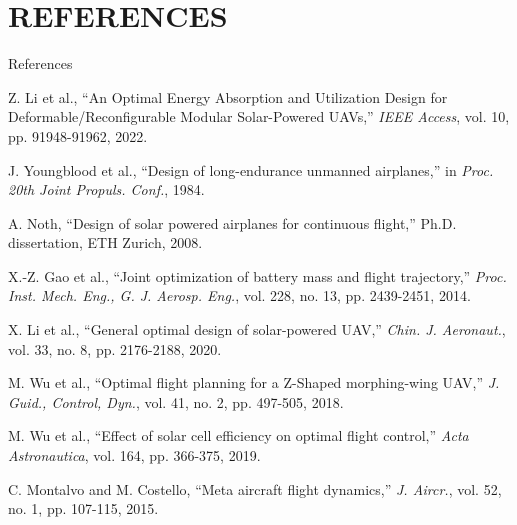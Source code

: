 \documentclass{beamer}
\begin{document}
\section{REFERENCES}

\begin{frame}{References}
    \scriptsize
    \setlength{\itemsep}{1pt}
    \setlength{\parskip}{1pt}
    \begin{thebibliography}{99}
        
         Z. Li et al., ``An Optimal Energy Absorption and Utilization Design for Deformable/Reconfigurable Modular Solar-Powered UAVs,'' \emph{IEEE Access}, vol. 10, pp. 91948-91962, 2022.
        
         J. Youngblood et al., ``Design of long-endurance unmanned airplanes,'' in \emph{Proc. 20th Joint Propuls. Conf.}, 1984.
        
         A. Noth, ``Design of solar powered airplanes for continuous flight,'' Ph.D. dissertation, ETH Zurich, 2008.
        
         X.-Z. Gao et al., ``Joint optimization of battery mass and flight trajectory,'' \emph{Proc. Inst. Mech. Eng., G. J. Aerosp. Eng.}, vol. 228, no. 13, pp. 2439-2451, 2014.
        
         X. Li et al., ``General optimal design of solar-powered UAV,'' \emph{Chin. J. Aeronaut.}, vol. 33, no. 8, pp. 2176-2188, 2020.
        
         M. Wu et al., ``Optimal flight planning for a Z-Shaped morphing-wing UAV,'' \emph{J. Guid., Control, Dyn.}, vol. 41, no. 2, pp. 497-505, 2018.
        
         M. Wu et al., ``Effect of solar cell efficiency on optimal flight control,'' \emph{Acta Astronautica}, vol. 164, pp. 366-375, 2019.
        
         C. Montalvo and M. Costello, ``Meta aircraft flight dynamics,'' \emph{J. Aircr.}, vol. 52, no. 1, pp. 107-115, 2015.
        
    \end{thebibliography}
\end{frame}
\end{document}
